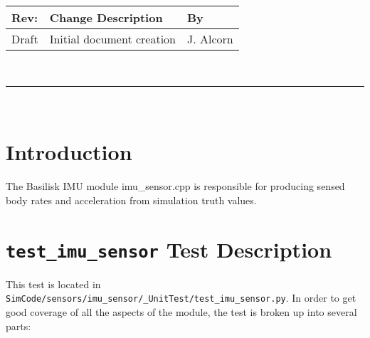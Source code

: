\documentclass[]{BasiliskReportMemo}
\begin{document}
\makeCover


%
%
\pagestyle{empty}
{\renewcommand{\arraystretch}{1.1}
\noindent
\begin{longtable}{|p{0.5in}|p{4.5in}|p{1.14in}|}
\hline
{\bfseries Rev}: & {\bfseries Change Description} & {\bfseries By} \\
\hline
Draft & Initial document creation & J. Alcorn \\
\hline

\end{longtable}
}

\newpage
\setcounter{page}{1}
\pagestyle{fancy}

\tableofcontents
~\\ \hrule ~\\


\section{Introduction}
The Basilisk IMU module imu\_sensor.cpp is responsible for producing sensed body rates and acceleration from simulation truth values.

\section{{\tt test\_imu\_sensor} Test Description}

This test is located in {\tt SimCode/sensors/imu\_sensor/\_UnitTest/test\_imu\_sensor.py}. In order to get good coverage of all the aspects of the module, the test is broken up into several parts: \par
\end{document}
